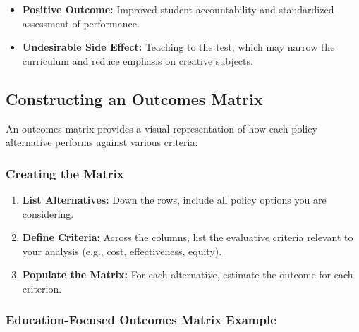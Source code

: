 \documentclass{article}
\theoremstyle{definition}
\theoremstyle{plain}
\begin{document}
\begin{itemize}
    \item \textbf{Positive Outcome:} Improved student accountability and standardized assessment of performance.
    \item \textbf{Undesirable Side Effect:} Teaching to the test, which may narrow the curriculum and reduce emphasis on creative subjects.
\end{itemize}

\subsection{Constructing an Outcomes Matrix}

An outcomes matrix provides a visual representation of how each policy alternative performs against various criteria:

\subsubsection{Creating the Matrix}

\begin{enumerate}
    \item \textbf{List Alternatives:} Down the rows, include all policy options you are considering.
    \item \textbf{Define Criteria:} Across the columns, list the evaluative criteria relevant to your analysis (e.g., cost, effectiveness, equity).
    \item \textbf{Populate the Matrix:} For each alternative, estimate the outcome for each criterion.
\end{enumerate}

\subsubsection{Education-Focused Outcomes Matrix Example}
\end{document}
